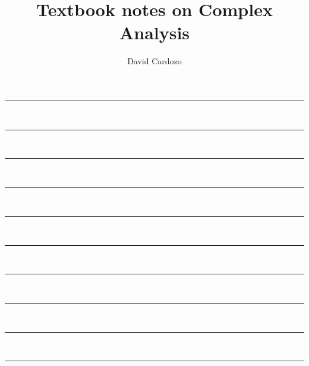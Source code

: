 \documentclass[notitlepage]{article}
\author{David Cardozo}
\title{Textbook notes on Complex Analysis}
\begin{document}





\noindent\rule{\textwidth}{1pt}\\[-0.1cm]



\noindent\rule{\textwidth}{1pt}\\[-0.1cm]



\noindent\rule{\textwidth}{1pt}\\[-0.1cm]



\noindent\rule{\textwidth}{1pt}\\[-0.1cm]



\noindent\rule{\textwidth}{1pt}\\[-0.1cm]



\noindent\rule{\textwidth}{1pt}\\[-0.1cm]



\noindent\rule{\textwidth}{1pt}\\[-0.1cm]



\noindent\rule{\textwidth}{1pt}\\[-0.1cm]



\noindent\rule{\textwidth}{1pt}\\[-0.1cm]



\noindent\rule{\textwidth}{1pt}\\[-0.1cm]


\end{document}

